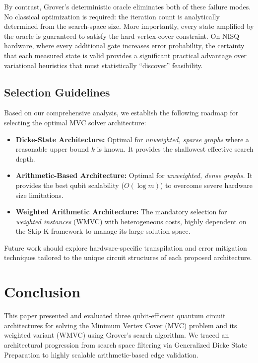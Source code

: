 \documentclass{ieeeaccess}
\begin{document}
By contrast, Grover's deterministic oracle eliminates both of these failure modes. No classical optimization is required: the iteration count is analytically determined from the search-space size. More importantly, every state amplified by the oracle is guaranteed to satisfy the hard vertex-cover constraint. On NISQ hardware, where every additional gate increases error probability, the certainty that each measured state is valid provides a significant practical advantage over variational heuristics that must statistically ``discover'' feasibility.

\subsection{Selection Guidelines}

Based on our comprehensive analysis, we establish the following roadmap for selecting the optimal MVC solver architecture:
\begin{itemize}
    \item \textbf{Dicke-State Architecture:} Optimal for \textit{unweighted, sparse graphs} where a reasonable upper bound $k$ is known. It provides the shallowest effective search depth.
    \item \textbf{Arithmetic-Based Architecture:} Optimal for \textit{unweighted, dense graphs}. It provides the best qubit scalability ($O(\log m)$) to overcome severe hardware size limitations.
    \item \textbf{Weighted Arithmetic Architecture:} The mandatory selection for \textit{weighted instances} (WMVC) with heterogeneous costs, highly dependent on the Skip-K framework to manage its large solution space.
\end{itemize}
Future work should explore hardware-specific transpilation and error mitigation techniques tailored to the unique circuit structures of each proposed architecture.


\section{Conclusion}
\label{sec:conclusion}

This paper presented and evaluated three qubit-efficient quantum circuit architectures for solving the Minimum Vertex Cover (MVC) problem and its weighted variant (WMVC) using Grover's search algorithm. We traced an architectural progression from search space filtering via Generalized Dicke State Preparation to highly scalable arithmetic-based edge validation. 
\end{document}
